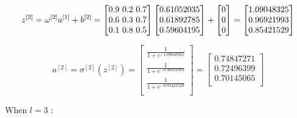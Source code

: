 \documentclass{article}
\begin{document}
\[
    z^{[2]} = \omega^{[2]} a^{[1]} + b^{[2]} = \begin{bmatrix}
        0.9 $ 0.2 $ 0.7 \\
        0.6 $ 0.3 $ 0.7 \\
        0.1 $ 0.8 $ 0.5 \\
    \end{bmatrix}
    \begin{bmatrix}
        0.61052035 \\
        0.61892785 \\
        0.59604195 \\
    \end{bmatrix}
    + \begin{bmatrix}
        0 \\
        0 \\
        0 \\
    \end{bmatrix}
    = \begin{bmatrix}
        1.09048325 \\
        0.96921993 \\
        0.85421529 \\
    \end{bmatrix}
\]

\[
    a^{[2]} = \sigma^{[2]}(z^{[2]}) = \begin{bmatrix}
        \frac{1}{1+e^{-1.09048325}} \\
        \frac{1}{1+e^{-0.96921993}} \\
        \frac{1}{1+e^{-0.85421529}} \\
    \end{bmatrix}
    = \begin{bmatrix}
        0.74847271 \\
        0.72496399 \\
        0.70145065 \\
    \end{bmatrix}
\]

When $l = 3$ :
\end{document}
